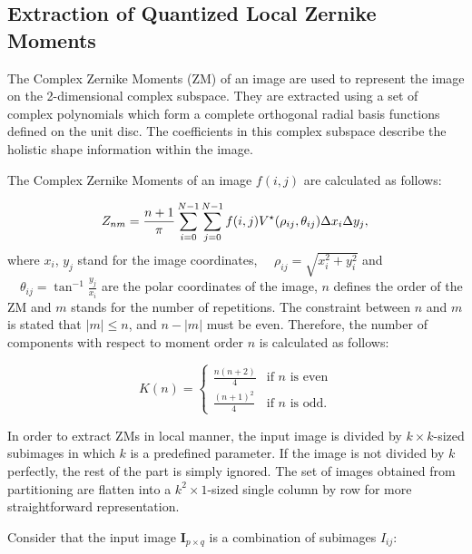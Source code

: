 \documentclass[]{spie}  %
\begin{document}
\subsection{Extraction of Quantized Local Zernike Moments} 

The Complex Zernike Moments (ZM) of an image are used to represent the image on the 2-dimensional complex subspace. They are extracted using a set of complex polynomials which form a complete orthogonal radial basis functions defined on the unit disc. The coefficients in this complex subspace describe the holistic shape information within the image. 

The Complex Zernike Moments of an image $f(i,j)$ are calculated as follows:

\begin{equation}
\label{eq:global_zernike}
Z_{nm} = \frac{n+1}{\pi}\sum^{N-1}_{i=0}\sum^{N-1}_{j=0}f(i,j)V^\star(\rho_{ij},\theta_{ij})\Delta
x_i\Delta y_j, \\
\end{equation}
where $x_i$, $y_j$ stand for the image coordinates, $\quad\rho_{ij}=\sqrt{x_i^2+y_i^2}$ and $\quad\theta_{ij} = \tan^{-1}\frac{y_j}{x_i}$ are the polar coordinates of the image, $n$ defines the order of the ZM and $m$ stands for the number of repetitions. The constraint between $n$ and $m$ is stated that $|m|\leq n$, and $n-|m|$ must be even. Therefore, the number of components with respect to moment order $n$ is calculated as follows:

\begin{equation}
K(n) =
\begin{cases}
  \frac{n(n+2)}{4} &\text{if $n$ is even} \\ 
  \frac{(n+1)^2}{4} &\text{if $n$ is odd}.
\end{cases}
\label{eq:num_moms}
\end{equation}

In order to extract ZMs in local manner, the input image is divided by $k\times k$-sized subimages in which $k$ is a predefined parameter. If the image is not divided by $k$ perfectly, the rest of the part is simply ignored. The set of images obtained from partitioning are flatten into a  $k^2\times 1$-sized single column by row for more straightforward representation.

Consider that the input image $\mathbf{I}_{p\times q}$ is a combination of subimages $I_{ij}$:
\end{document}
